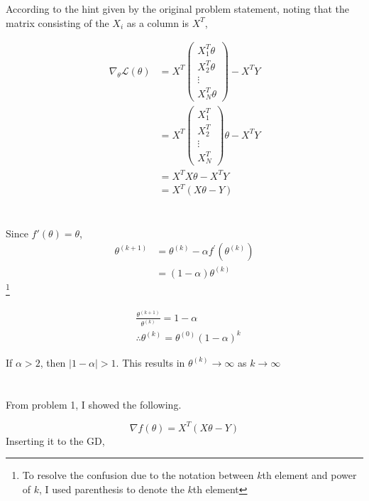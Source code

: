 \documentclass[10pt]{article}
\begin{document}
According to the hint given by the original problem statement, noting that the matrix consisting of the $X_i$ as a column is $X^T$,

\begin{align}
    \nabla_\theta \mathcal{L}(\theta) &= X^T \begin{pmatrix} X_1^T\theta \\ X_2^T\theta \\ \vdots \\ X_N^T\theta\end{pmatrix} - X^TY \\
    &= X^T\begin{pmatrix} X_1^T \\ X_2^T \\ \vdots \\ X_N^T\end{pmatrix}\theta - X^TY \\ &= X^TX\theta - X^TY \\ &= X^T(X\theta - Y) 
\end{align}


\section{}

Since $f'(\theta) = \theta$, 
\begin{align}
    \theta^{(k+1)} &= \theta^{(k)} - \alpha f^\prime(\theta^{(k)}) 
    \\ &= (1-\alpha) \theta^{(k)}
\end{align}
\footnote{To resolve the confusion due to the notation between $k$th element and power of $k$, I used parenthesis to denote the $k$th element}

\begin{align}
    &\frac{\theta^{(k+1)}}{\theta^{(k)}} = 1-\alpha \\
    &\therefore \theta^{(k)} = \theta^{(0)}(1-\alpha)^k
\end{align}

If $\alpha >2$, then $\left|1-\alpha\right|>1$. This results in $\theta^{(k)} \rightarrow \infty $ as $k\rightarrow \infty$
\section{}

From problem 1, I showed the following. 

\begin{equation}
    \nabla f(\theta) = X^T(X\theta - Y)
\end{equation}
Inserting it to the GD,
\end{document}
